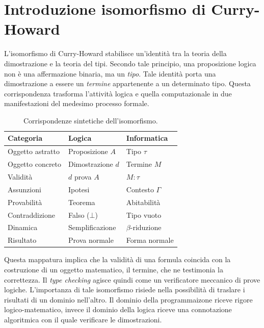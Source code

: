 \section{Introduzione isomorfismo di Curry-Howard}
L'isomorfismo di Curry-Howard stabilisce un'identità tra la teoria della dimostrazione e la teoria del tipi. Secondo tale 
principio, una proposizione logica non è una affermazione binaria, ma un \emph{tipo}. Tale identità porta una dimostrazione 
a essere un \emph{termine} appartenente a un determinato tipo. Questa corrispondenza trasforma l'attività logica e quella 
computazionale in due manifestazioni del medesimo processo formale.
\begin{table}[H]
    \centering
    \renewcommand{\arraystretch}{1.3}
    \begin{tabular}{lll}
        \hline
        \textbf{Categoria} & \textbf{Logica}   & \textbf{Informatica} \\ \hline
        Oggetto astratto   & Proposizione $A$  & Tipo $\tau$          \\
        Oggetto concreto   & Dimostrazione $d$ & Termine $M$          \\
        Validità           & $d$ prova $A$     & $M : \tau$           \\
        Assunzioni         & Ipotesi           & Contesto $\Gamma$    \\
        Provabilità        & Teorema           & Abitabilità          \\
        Contraddizione     & Falso ($\bot$)    & Tipo vuoto           \\
        Dinamica           & Semplificazione   & $\beta$-riduzione    \\
        Risultato          & Prova normale     & Forma normale        \\ \hline
    \end{tabular}
    \caption{Corrispondenze sintetiche dell'isomorfismo.}
    \label{tab:curry_howard_isomorphism}
\end{table}\noindent
Questa mappatura implica che la validità di una formula coincida con la costruzione di un oggetto matematico, il termine,
che ne testimonia la correttezza. Il \emph{type checking} agisce quindi come un verificatore meccanico di prove logiche.
L'importanza di tale isomorfismo risiede nella possibilità di traslare i risultati di un dominio nell'altro. Il dominio
della programmaizone riceve rigore logico-matematico, invece il dominio della logica riceve una connotazione algoritmica con il
quale verificare le dimostrazioni.

